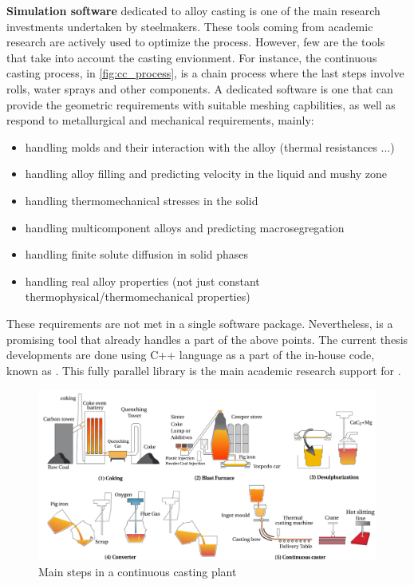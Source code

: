 \textbf{Simulation software } dedicated to alloy casting is one of the main research investments undertaken by steelmakers. These tools coming from academic research
are actively used to optimize the process. However, few are the tools that take into account the casting envionment. For instance, the continuous casting process, in
\autoref{fig:cc_process}, is a chain process where the last steps involve rolls, water sprays and other components. A dedicated software is one that can provide the
geometric requirements with suitable meshing capbilities, as well as respond to metallurgical and mechanical requirements, mainly:
\begin{itemize}
\item handling molds and their interaction with the alloy (thermal resistances ...)
\item handling alloy filling and predicting velocity in the liquid and mushy zone
\item handling thermomechanical stresses in the solid
\item handling multicomponent alloys and predicting macrosegregation
\item handling finite solute diffusion in solid phases
\item handling real alloy properties (not just constant thermophysical/thermomechanical properties)
\end{itemize}

These requirements are not met in a single software package. Nevertheless, \thercast is a promising tool that already 
handles a part of the above points. The current thesis developments are done using C++ language as a part of the
in-house code, known as \cimlib. This fully parallel library is the main academic research support for \thercast.

\begin{figure}
	\centering
	\includegraphics[width=\textwidth]{Chapter0/Graphics/cc_process}
\caption{Main steps in a continuous casting plant}
\label{fig:cc_process}
\end{figure}


